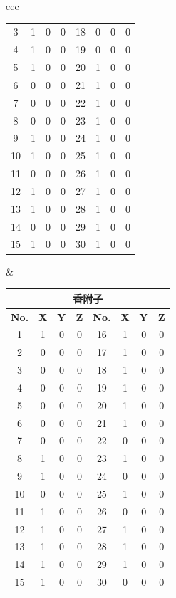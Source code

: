 \documentclass[10.5pt]{config}
\begin{document}
\begin{table}[htbp]
{\begin{tabular}{ccc}
\begin{tabular}{cccc|cccc}
3 & 1 & 0 & 0 & 18 & 0 & 0 & 0 \\
4 & 1 & 0 & 0 & 19 & 0 & 0 & 0 \\
5 & 1 & 0 & 0 & 20 & 1 & 0 & 0 \\
6 & 0 & 0 & 0 & 21 & 1 & 0 & 0 \\
7 & 0 & 0 & 0 & 22 & 1 & 0 & 0 \\
8 & 0 & 0 & 0 & 23 & 1 & 0 & 0 \\
9 & 1 & 0 & 0 & 24 & 1 & 0 & 0 \\
10 & 1 & 0 & 0 & 25 & 1 & 0 & 0 \\
11 & 0 & 0 & 0 & 26 & 1 & 0 & 0 \\
12 & 1 & 0 & 0 & 27 & 1 & 0 & 0 \\
13 & 1 & 0 & 0 & 28 & 1 & 0 & 0 \\
14 & 0 & 0 & 0 & 29 & 1 & 0 & 0 \\
15 & 1 & 0 & 0 & 30 & 1 & 0 & 0 \\
\bottomrule
\end{tabular} & 
\begin{tabular}{cccc|cccc}
\multicolumn{8}{c}{\textbf{香附子}} \\
\toprule
\textbf{No.} & \textbf{X} & \textbf{Y} & \textbf{Z} & \textbf{No.} & \textbf{X} & \textbf{Y} & \textbf{Z} \\
\midrule
1 & 1 & 0 & 0 & 16 & 1 & 0 & 0 \\
2 & 0 & 0 & 0 & 17 & 1 & 0 & 0 \\
3 & 0 & 0 & 0 & 18 & 1 & 0 & 0 \\
4 & 0 & 0 & 0 & 19 & 1 & 0 & 0 \\
5 & 0 & 0 & 0 & 20 & 1 & 0 & 0 \\
6 & 0 & 0 & 0 & 21 & 1 & 0 & 0 \\
7 & 0 & 0 & 0 & 22 & 0 & 0 & 0 \\
8 & 1 & 0 & 0 & 23 & 1 & 0 & 0 \\
9 & 1 & 0 & 0 & 24 & 0 & 0 & 0 \\
10 & 0 & 0 & 0 & 25 & 1 & 0 & 0 \\
11 & 1 & 0 & 0 & 26 & 0 & 0 & 0 \\
12 & 1 & 0 & 0 & 27 & 1 & 0 & 0 \\
13 & 1 & 0 & 0 & 28 & 1 & 0 & 0 \\
14 & 1 & 0 & 0 & 29 & 1 & 0 & 0 \\
15 & 1 & 0 & 0 & 30 & 0 & 0 & 0 \\
\bottomrule
\end{tabular} \\
\end{tabular}
}
\vspace{0.5em}
\end{table}
\end{document}
